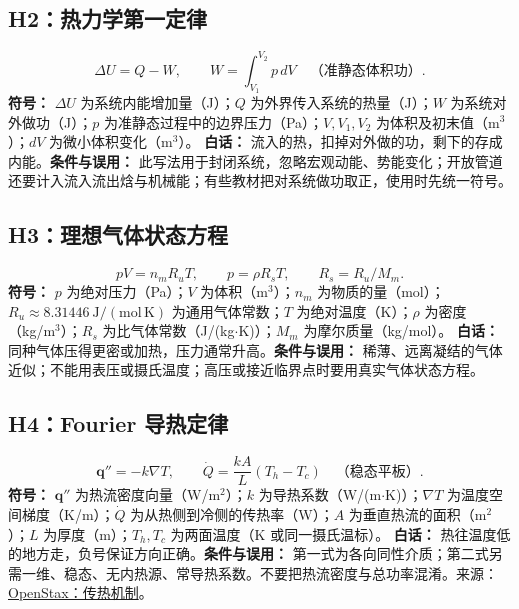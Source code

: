 \documentclass[UTF8,zihao=-4,openany,oneside,fontset=windows]{ctexbook}
\begin{document}
\subsection{H2：热力学第一定律}
\begin{equation}
\Delta U=Q-W,\qquad W=\int_{V_1}^{V_2}p\,dV\quad\text{（准静态体积功）}.
\end{equation}
\textbf{符号：} $\Delta U$ 为系统内能增加量（J）；$Q$ 为外界传入系统的热量（J）；$W$ 为系统对外做功（J）；$p$ 为准静态过程中的边界压力（Pa）；$V,V_1,V_2$ 为体积及初末值（m$^3$）；$dV$ 为微小体积变化（m$^3$）。
\textbf{白话：} 流入的热，扣掉对外做的功，剩下的存成内能。\textbf{条件与误用：} 此写法用于封闭系统，忽略宏观动能、势能变化；开放管道还要计入流入流出焓与机械能；有些教材把对系统做功取正，使用时先统一符号。

\subsection{H3：理想气体状态方程}
\begin{equation}
pV=n_mR_uT,\qquad p=\rho R_sT,\qquad R_s=R_u/M_m.
\end{equation}
\textbf{符号：} $p$ 为绝对压力（Pa）；$V$ 为体积（m$^3$）；$n_m$ 为物质的量（mol）；$R_u\approx8.31446\ \mathrm{J/(mol\,K)}$ 为通用气体常数；$T$ 为绝对温度（K）；$\rho$ 为密度（kg/m$^3$）；$R_s$ 为比气体常数（J/(kg$\cdot$K)）；$M_m$ 为摩尔质量（kg/mol）。
\textbf{白话：} 同种气体压得更密或加热，压力通常升高。\textbf{条件与误用：} 稀薄、远离凝结的气体近似；不能用表压或摄氏温度；高压或接近临界点时要用真实气体状态方程。

\subsection{H4：Fourier 导热定律}
\begin{equation}
\mathbf q''=-k\nabla T,\qquad \dot Q=\frac{kA}{L}(T_h-T_c)\quad\text{（稳态平板）}.
\end{equation}
\textbf{符号：} $\mathbf q''$ 为热流密度向量（W/m$^2$）；$k$ 为导热系数（W/(m$\cdot$K)）；$\nabla T$ 为温度空间梯度（K/m）；$\dot Q$ 为从热侧到冷侧的传热率（W）；$A$ 为垂直热流的面积（m$^2$）；$L$ 为厚度（m）；$T_h,T_c$ 为两面温度（K 或同一摄氏温标）。
\textbf{白话：} 热往温度低的地方走，负号保证方向正确。\textbf{条件与误用：} 第一式为各向同性介质；第二式另需一维、稳态、无内热源、常导热系数。不要把热流密度与总功率混淆。来源：\href{https://openstax.org/books/university-physics-volume-2/pages/1-6-mechanisms-of-heat-transfer}{OpenStax：传热机制}。
\end{document}
